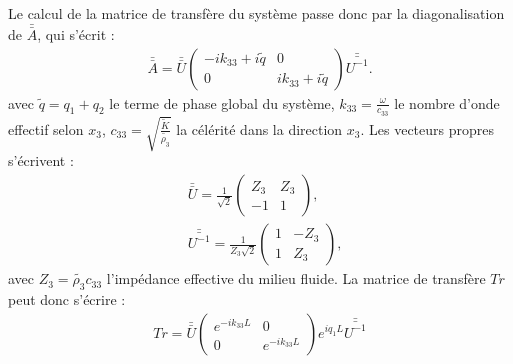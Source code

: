 \documentclass[12pt]{report}
\begin{document}
    Le calcul de la matrice de transfère du système passe donc par la diagonalisation de $\bar{\bar{A}}$, qui s'écrit :
    \begin{align}
    \bar{\bar{A}}=\bar{\bar{U}} \begin{pmatrix}
    								-ik_{33}+i\tilde{q} & 0 \\ 0 & ik_{33}+i\tilde{q} 
    							\end{pmatrix} \bar{\bar{U^{-1}}}.
    \end{align}
    avec $\tilde{q}=q_1+q_2$ le terme de phase global du système, $k_{33}=\frac{\omega}{c_{33}}$ le nombre d'onde effectif selon $x_3$, $c_{33}=\sqrt{\frac{\tilde{K}}{\tilde{\rho_3}}}$ la célérité dans la direction $x_3$.
    Les vecteurs propres s'écrivent :
    \begin{align}
    &\bar{\bar{U}}=\frac{1}{\sqrt{2}}\begin{pmatrix}
    					Z_3 & Z_3 \\ -1 & 1
    								\end{pmatrix},\\
    &\bar{\bar{U^{-1}}}=\frac{1}{Z_3 \sqrt{2}}\begin{pmatrix}
    					1 & -Z_3 \\ 1 & Z_3
    		   						\end{pmatrix},           
    \end{align}
    avec $Z_3=\tilde{\rho_3}c_{33}$ l'impédance effective du milieu fluide.
    La matrice de transfère $Tr$ peut donc s'écrire :
        \begin{align}
    Tr=\bar{\bar{U}}\begin{pmatrix}
    e^{-ik_{33}L} & 0 \\ 0 & e^{-ik_{33}L} 
    \end{pmatrix} e^{iq_1L}\bar{\bar{U^{-1}}}\label{Matrice_Transfere}
    \end{align}
\end{document}
